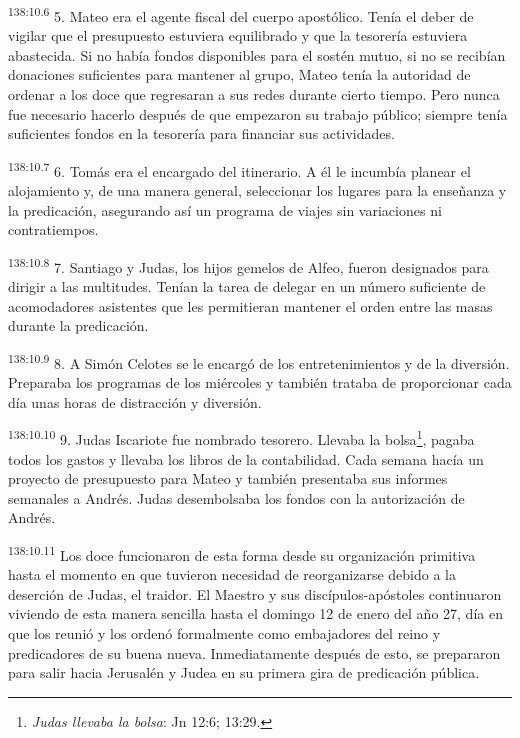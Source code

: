 \par 
\textsuperscript{138:10.6} 5. Mateo era el agente fiscal del cuerpo apostólico. Tenía el deber de vigilar que el presupuesto estuviera equilibrado y que la tesorería estuviera abastecida. Si no había fondos disponibles para el sostén mutuo, si no se recibían donaciones suficientes para mantener al grupo, Mateo tenía la autoridad de ordenar a los doce que regresaran a sus redes durante cierto tiempo. Pero nunca fue necesario hacerlo después de que empezaron su trabajo público; siempre tenía suficientes fondos en la tesorería para financiar sus actividades.

\par 
\textsuperscript{138:10.7} 6. Tomás era el encargado del itinerario. A él le incumbía planear el alojamiento y, de una manera general, seleccionar los lugares para la enseñanza y la predicación, asegurando así un programa de viajes sin variaciones ni contratiempos.

\par 
\textsuperscript{138:10.8} 7. Santiago y Judas, los hijos gemelos de Alfeo, fueron designados para dirigir a las multitudes. Tenían la tarea de delegar en un número suficiente de acomodadores asistentes que les permitieran mantener el orden entre las masas durante la predicación.

\par 
\textsuperscript{138:10.9} 8. A Simón Celotes se le encargó de los entretenimientos y de la diversión. Preparaba los programas de los miércoles y también trataba de proporcionar cada día unas horas de distracción y diversión.

\par 
\textsuperscript{138:10.10} 9. Judas Iscariote fue nombrado tesorero. Llevaba la bolsa\footnote{\textit{Judas llevaba la bolsa}: Jn 12:6; 13:29.}, pagaba todos los gastos y llevaba los libros de la contabilidad. Cada semana hacía un proyecto de presupuesto para Mateo y también presentaba sus informes semanales a Andrés. Judas desembolsaba los fondos con la autorización de Andrés.

\par 
\textsuperscript{138:10.11} Los doce funcionaron de esta forma desde su organización primitiva hasta el momento en que tuvieron necesidad de reorganizarse debido a la deserción de Judas, el traidor. El Maestro y sus discípulos-apóstoles continuaron viviendo de esta manera sencilla hasta el domingo 12 de enero del año 27, día en que los reunió y los ordenó formalmente como embajadores del reino y predicadores de su buena nueva. Inmediatamente después de esto, se prepararon para salir hacia Jerusalén y Judea en su primera gira de predicación pública.
